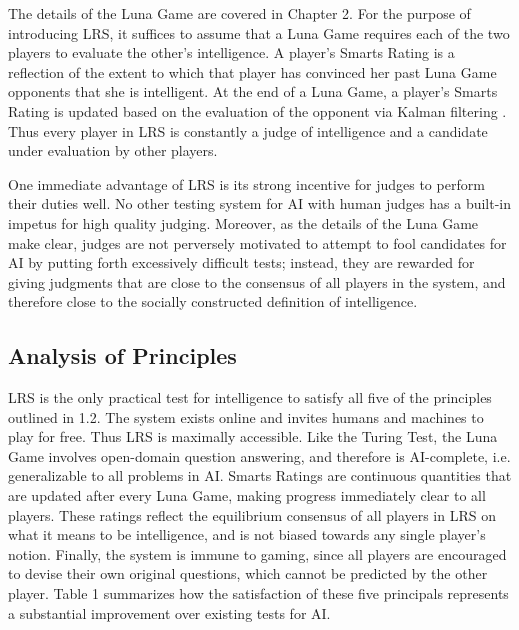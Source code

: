 The details of the Luna Game are covered in Chapter 2. For the purpose of introducing LRS, it suffices to assume that a Luna Game requires each of the two players to evaluate the other's intelligence. A player's Smarts Rating is a reflection of the extent to which that player has convinced her past Luna Game opponents that she is intelligent. At the end of a Luna Game, a player's Smarts Rating is updated based on the evaluation of the opponent via Kalman filtering \cite{julier97}. Thus every player in LRS is constantly a judge of intelligence and a candidate under evaluation by other players.

One immediate advantage of LRS is its strong incentive for judges to perform their duties well. No other testing system for AI with human judges has a built-in impetus for high quality judging. Moreover, as the details of the Luna Game make clear, judges are not perversely motivated to attempt to fool candidates for AI by putting forth excessively difficult tests; instead, they are rewarded for giving judgments that are close to the consensus of all players in the system, and therefore close to the socially constructed definition of intelligence. 

\subsection{Analysis of Principles}

LRS is the only practical test for intelligence to satisfy all five of the principles outlined in 1.2. The system exists online and invites humans and machines to play for free. Thus LRS is maximally accessible. Like the Turing Test, the Luna Game involves open-domain question answering, and therefore is AI-complete, i.e. generalizable to all problems in AI. Smarts Ratings are continuous quantities that are updated after every Luna Game, making progress immediately clear to all players. These ratings reflect the equilibrium consensus of all players in LRS on what it means to be intelligence, and is not biased towards any single player's notion. Finally, the system is immune to gaming, since all players are encouraged to devise their own original questions, which cannot be predicted by the other player. Table 1 summarizes how the satisfaction of these five principals represents a substantial improvement over existing tests for AI.

